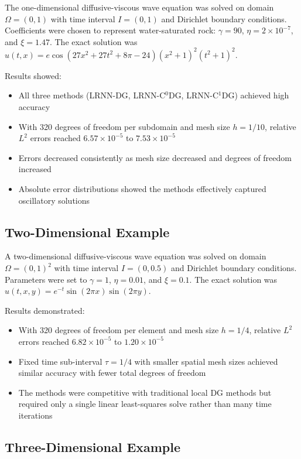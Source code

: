 \documentclass[11pt,a4paper]{article}
\begin{document}
The one-dimensional diffusive-viscous wave equation was solved on domain $\Omega = (0,1)$ with time interval $I = (0,1)$ and Dirichlet boundary conditions. Coefficients were chosen to represent water-saturated rock: $\gamma = 90$, $\eta = 2 \times 10^{-7}$, and $\xi = 1.47$. The exact solution was $u(t,x) = e \cos(27x^2 + 27t^2 + 8\pi - 24)(x^2 + 1)^2(t^2 + 1)^2$.

Results showed:
\begin{itemize}
    \item All three methods (LRNN-DG, LRNN-C$^0$DG, LRNN-C$^1$DG) achieved high accuracy
    \item With 320 degrees of freedom per subdomain and mesh size $h = 1/10$, relative $L^2$ errors reached $6.57 \times 10^{-5}$ to $7.53 \times 10^{-5}$
    \item Errors decreased consistently as mesh size decreased and degrees of freedom increased
    \item Absolute error distributions showed the methods effectively captured oscillatory solutions
\end{itemize}

\subsection{Two-Dimensional Example}

A two-dimensional diffusive-viscous wave equation was solved on domain $\Omega = (0,1)^2$ with time interval $I = (0,0.5)$ and Dirichlet boundary conditions. Parameters were set to $\gamma = 1$, $\eta = 0.01$, and $\xi = 0.1$. The exact solution was $u(t,x,y) = e^{-t} \sin(2\pi x) \sin(2\pi y)$.

Results demonstrated:
\begin{itemize}
    \item With 320 degrees of freedom per element and mesh size $h = 1/4$, relative $L^2$ errors reached $6.82 \times 10^{-5}$ to $1.20 \times 10^{-5}$
    \item Fixed time sub-interval $\tau = 1/4$ with smaller spatial mesh sizes achieved similar accuracy with fewer total degrees of freedom
    \item The methods were competitive with traditional local DG methods but required only a single linear least-squares solve rather than many time iterations
\end{itemize}

\subsection{Three-Dimensional Example}
\end{document}

